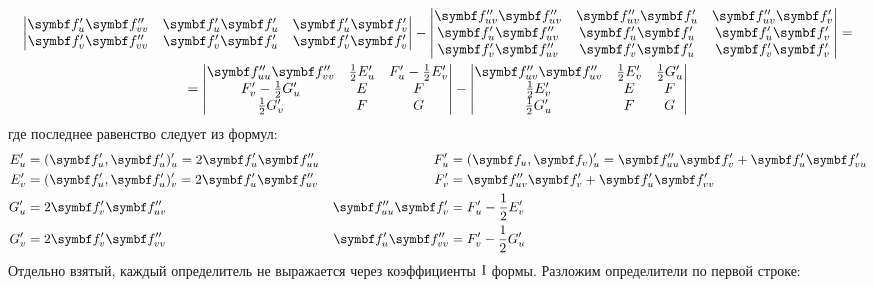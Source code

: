 \documentclass[main]{subfiles}
\begin{document}
\begin{longProof}
\begin{multline*}
\begin{vmatrix}
            \vf'_u \vf''_{vv}     & \vf'_u\vf'_u      & \vf'_u \vf'_v    \\
            \vf'_v \vf''_{vv}     & \vf'_v\vf'_u      & \vf'_v \vf'_v
        \end{vmatrix} -
        \begin{vmatrix}
            \vf''_{uv} \vf''_{uv} & \vf''_{uv} \vf'_u & \vf''_{uv}\vf'_v \\
            \vf'_u \vf''_{uv}     & \vf'_u\vf'_u      & \vf'_u \vf'_v    \\
            \vf'_v \vf''_{uv}     & \vf'_v\vf'_u      & \vf'_v \vf'_v
        \end{vmatrix}= \\
        = \begin{vmatrix}
            \vf''_{uu} \vf''_{vv}  & \frac{1}{2}E'_u & F'_u - \frac{1}{2}E'_v \\
            F'_v - \frac{1}{2}G'_u & E               & F                      \\
            \frac{1}{2}G'_v        & F               & G
        \end{vmatrix}-
        \begin{vmatrix}
            \vf''_{uv}\vf''_{uv} & \frac{1}{2} E'_v & \frac{1}{2} G'_u \\
            \frac{1}{2} E'_v     & E                & F                \\
            \frac{1}{2} G'_u     & F                & G
        \end{vmatrix}
    \end{multline*}
    где последнее равенство следует из формул:
    \begin{align*}
        E'_u & = (\vf'_u, \vf'_u)'_u = 2\vf'_u \vf''_{uu} & F'_u              & = (\vf_u, \vf_v)'_u = \vf''_{uu}\vf'_v + \vf'_u \vf'_{vu} \\
        E'_v & = (\vf'_u, \vf'_u)'_v = 2\vf'_u \vf''_{uv} & F'_v              & = \vf''_{uv}\vf'_v + \vf'_u \vf'_{vv}                     \\
        G'_u & = 2 \vf'_v \vf''_{uv}                      & \vf''_{uu}\vf'_v  & = F'_u - \frac{1}{2}E'_v                                  \\
        G'_v & = 2 \vf'_v \vf''_{vv}                      & \vf'_u \vf''_{vv} & = F'_v - \frac{1}{2}G'_u
    \end{align*}
    Отдельно взятый, каждый определитель не выражается через коэффициенты $\mathrm{I}$ формы.
    Разложим определители по первой строке:
    \begin{multline*}

\end{multline*}
\end{longProof}
\end{document}
